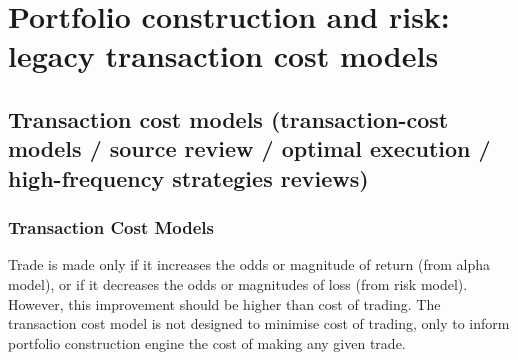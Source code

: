 \documentclass[a4paper,oneside,openany]{book}
\begin{document}
\chapter*{Portfolio construction and risk: legacy transaction cost models}

\section*{Transaction cost models (transaction-cost models / source review / optimal execution / high-frequency strategies reviews)}

\subsection*{Transaction Cost Models}

Trade is made only if it increases the odds or magnitude of return (from alpha model), or if it decreases the odds or magnitudes of loss (from risk model). However, this improvement should be higher than cost of trading. The transaction cost model is not designed to minimise cost of trading, only to inform portfolio construction engine the cost of making any given trade.
\end{document}
